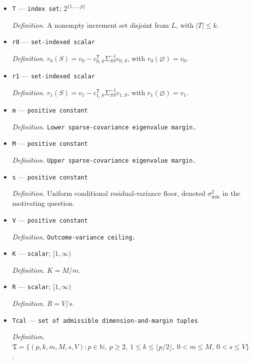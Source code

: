 \documentclass{article}
\begin{document}
\begin{itemize}
  \par\smallskip\noindent\emph{Definition.} A conditioning set with \(|L|\le k\).
  \item \texttt{T} --- \texttt{index set}; \(2^{\{1,\ldots,p\}}\)
  \par\smallskip\noindent\emph{Definition.} A nonempty increment set disjoint from \(L\), with \(|T|\le k\).
  \item \texttt{r0} --- \texttt{set-\allowbreak{}indexed scalar}
  \par\smallskip\noindent\emph{Definition.} \(r_0(S)=v_0-c_{0,S}^{\mathsf T}\Sigma_{SS}^{-1}c_{0,S}\), with \(r_0(\varnothing)=v_0\).
  \item \texttt{r1} --- \texttt{set-\allowbreak{}indexed scalar}
  \par\smallskip\noindent\emph{Definition.} \(r_1(S)=v_1-c_{1,S}^{\mathsf T}\Sigma_{SS}^{-1}c_{1,S}\), with \(r_1(\varnothing)=v_1\).
  \item \texttt{m} --- \texttt{positive constant}
  \par\smallskip\noindent\emph{Definition.} \texttt{Lower sparse-\allowbreak{}covariance eigenvalue margin.}
  \item \texttt{M} --- \texttt{positive constant}
  \par\smallskip\noindent\emph{Definition.} \texttt{Upper sparse-\allowbreak{}covariance eigenvalue margin.}
  \item \texttt{s} --- \texttt{positive constant}
  \par\smallskip\noindent\emph{Definition.} Uniform conditional residual-variance floor, denoted \(\sigma_{\min}^2\) in the motivating question.
  \item \texttt{V} --- \texttt{positive constant}
  \par\smallskip\noindent\emph{Definition.} \texttt{Outcome-\allowbreak{}variance ceiling.}
  \item \texttt{K} --- \texttt{scalar}; \([1,\infty)\)
  \par\smallskip\noindent\emph{Definition.} \(K=M/m\).
  \item \texttt{R} --- \texttt{scalar}; \([1,\infty)\)
  \par\smallskip\noindent\emph{Definition.} \(R=V/s\).
  \item \texttt{Tcal} --- \texttt{set of admissible dimension-\allowbreak{}and-\allowbreak{}margin tuples}
  \par\smallskip\noindent\emph{Definition.} \(\mathfrak T=\{(p,k,m,M,s,V):p\in\mathbb N,\ p\ge2,\ 1\le k\le\lfloor p/2\rfloor,\ 0<m\le M,\ 0<s\le V\}\).

\end{itemize}
\end{document}
